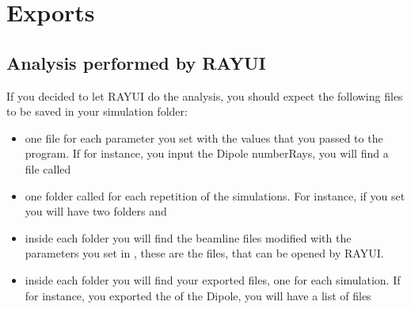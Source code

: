 \documentclass[letterpaper,10pt,english]{sphinxmanual}
\begin{document}
\section{Exports}
\label{\detokenize{tutorial:exports}}

\subsection{Analysis performed by RAY\sphinxhyphen{}UI}
\label{\detokenize{tutorial:analysis-performed-by-ray-ui}}
\sphinxAtStartPar
If you decided to let RAY\sphinxhyphen{}UI do the analysis, you should expect the following files to be
saved in your simulation folder:
\begin{itemize}
\item {} 
\sphinxAtStartPar
one file for each parameter you set with the values that you passed to the program.
If for instance, you input the Dipole numberRays, you will find a file called

\item {} 
\sphinxAtStartPar
one folder called  for each repetition of the simulations.
For instance, if you set  you will have two folders  and 

\item {} 
\sphinxAtStartPar
inside each  folder you will find the beamline files modified
with the parameters you set in , these are the  files,
that can be opened by RAY\sphinxhyphen{}UI.

\item {} 
\sphinxAtStartPar
inside each  folder you will find your exported files, one for
each simulation. If for instance, you exported the  of the Dipole,
you will have a list of files 

\end{itemize}
\end{document}
